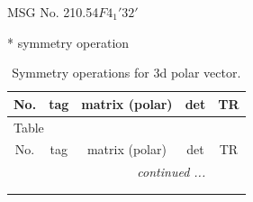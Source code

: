 \documentclass[fleqn,8pt]{jsarticle}
\begin{document}
\setcounter{MaxMatrixCols}{32}

\renewcommand{\tablename}{Table~}
\renewcommand{\figurename}{Figure~}
\begin{center}
\LARGE
MSG No. 210.54\quad$F4_{1}'32'$
\end{center}
* symmetry operation
\renewcommand{\arraystretch}{1.3}
\begin{longtable}{ccccc}
\caption{Symmetry operations for 3d polar vector.}
 \\
 \hline \hline
No. & tag & matrix (polar) & det & TR \\ \hline \endfirsthead

\multicolumn{4}{l}{\tablename\ \thetable{}} \\
 \hline \hline
No. & tag & matrix (polar) & det & TR \\ \hline \endhead

 \hline \hline
\multicolumn{4}{r}{\footnotesize\it continued ...} \\ \endfoot

 \hline \hline
\multicolumn{4}{r}{} \\ \endlastfoot


\end{longtable}
\end{document}
